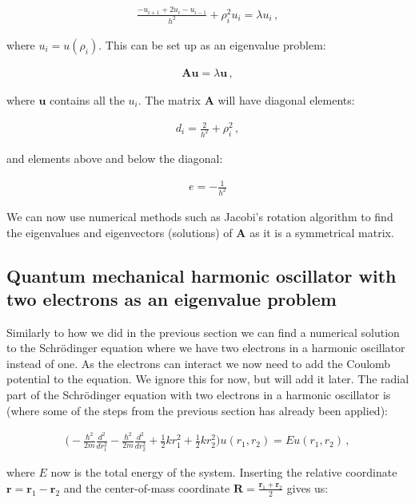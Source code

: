 \documentclass[reprint,english,notitlepage]{revtex4-1}  %
\begin{document}
\begin{align*}
\frac{-u_{i+1} + 2u_i - u_{i-1}}{h^2} + \rho_i^2 u_i = \lambda u_i \, ,
\end{align*}

where $u_i = u(\rho_i)$. This can be set up as an eigenvalue problem:

\begin{align*}
\textbf{Au} = \lambda \textbf{u} \, ,
\end{align*}

where $\textbf{u}$ contains all the $u_i$. The matrix \textbf{A} will have diagonal elements:

\begin{align*}
d_i = \frac{2}{h^2} + \rho_i^2 \, ,
\end{align*}

and elements above and below the diagonal:

\begin{align*}
e = -\frac{1}{h^2}
\end{align*}

We can now use numerical methods such as Jacobi's rotation algorithm to find the eigenvalues and eigenvectors (solutions) of \textbf{A} as it is a symmetrical matrix.


\subsection{Quantum mechanical harmonic oscillator with two electrons as an eigenvalue problem} \label{sec:II:e}

Similarly to how we did in the previous section we can find a numerical solution to the Schrödinger equation where we have two electrons in a harmonic oscillator instead of one. As the electrons can interact we now need to add the Coulomb potential to the equation. We ignore this for now, but will add it later. The radial part of the Schrödinger equation with two electrons in a harmonic oscillator is (where some of the steps from the previous section has already been applied):

\begin{align*}
\bigg( -\frac{\hbar^2}{2m} \frac{d^2}{dr_1^2} - \frac{\hbar^2}{2m} \frac{d^2}{dr_2^2} + \frac{1}{2}kr_1^2 + \frac{1}{2}kr_2^2 \bigg) u(r_1,r_2) =  Eu(r_1,r_2) \, ,
\end{align*}

where $E$ now is the total energy of the system. Inserting the relative coordinate $\textbf{r} = \textbf{r}_1 - \textbf{r}_2$ and the center-of-mass coordinate $\textbf{R} = \frac{\textbf{r}_1 + \textbf{r}_2}{2}$ gives us:
\end{document}
